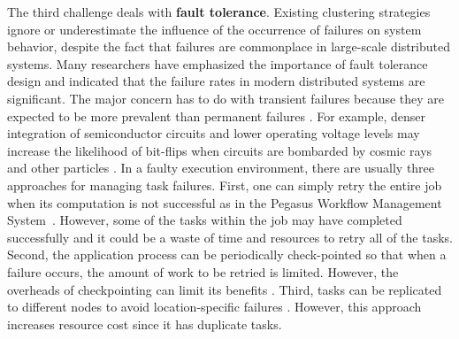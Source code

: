 


The third challenge deals with \textbf{fault tolerance}. Existing clustering strategies ignore or underestimate the influence of the occurrence of failures on system behavior, despite the fact that failures are commonplace in large-scale distributed systems. Many researchers \cite{Zhang2004, Tang1990, Schroeder2006, Sahoo2004} have emphasized the importance of fault tolerance design and indicated that the failure rates in modern distributed systems are significant. The major concern has to do with transient failures because they are expected to be more prevalent than permanent failures \cite{Zhang2004}. For example, denser integration of semiconductor circuits and lower operating voltage levels may increase the likelihood of bit-flips when circuits are bombarded by cosmic rays and other particles \cite{Zhang2004}. In a faulty execution environment, there are usually three approaches for managing task failures. First, one can simply retry the entire job when its computation is not successful as in the Pegasus Workflow Management System~\cite{Deelman2004}. However, some of the tasks within the job may have completed successfully and it could be a waste of time and resources to retry all of the tasks. Second, the application process can be periodically check-pointed so that when a failure occurs, the amount of work to be retried is limited. However, the overheads of checkpointing can limit its benefits \cite{Zhang2004}. Third, tasks can be replicated to different nodes to avoid location-specific failures \cite{Zhang2009}. However, this approach increases resource cost since it has duplicate tasks. 


